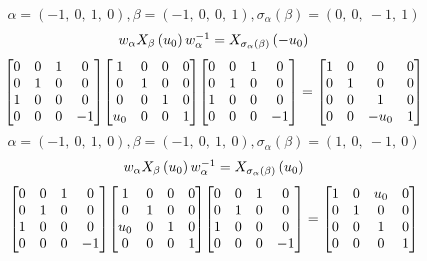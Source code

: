 \documentclass[11pt]{article}
\theoremstyle{definition}
\begin{document}
\[
\alpha = \left( -1, \  0, \  1, \  0\right), \beta = \left( -1, \  0, \  0, \  1\right), \sigma_{\alpha}(\beta) = \left( 0, \  0, \  -1, \  1\right)
\]
\[
\scaletoalign{\textwidth}{w_{\alpha} X_{\beta}\left(u_{0}\right) w_{\alpha}^{-1} = X_{\sigma_{\alpha}\left(\beta\right)}\left(- u_{0}\right)}
\]
\[
\scaletoalign{\textwidth}{{\left[\begin{matrix}0 & 0 & 1 & 0\\0 & 1 & 0 & 0\\1 & 0 & 0 & 0\\0 & 0 & 0 & -1\end{matrix}\right]} {\left[\begin{matrix}1 & 0 & 0 & 0\\0 & 1 & 0 & 0\\0 & 0 & 1 & 0\\u_{0} & 0 & 0 & 1\end{matrix}\right]} {\left[\begin{matrix}0 & 0 & 1 & 0\\0 & 1 & 0 & 0\\1 & 0 & 0 & 0\\0 & 0 & 0 & -1\end{matrix}\right]} = {\left[\begin{matrix}1 & 0 & 0 & 0\\0 & 1 & 0 & 0\\0 & 0 & 1 & 0\\0 & 0 & - u_{0} & 1\end{matrix}\right]}}
\]
\[
\alpha = \left( -1, \  0, \  1, \  0\right), \beta = \left( -1, \  0, \  1, \  0\right), \sigma_{\alpha}(\beta) = \left( 1, \  0, \  -1, \  0\right)
\]
\[
\scaletoalign{\textwidth}{w_{\alpha} X_{\beta}\left(u_{0}\right) w_{\alpha}^{-1} = X_{\sigma_{\alpha}\left(\beta\right)}\left(u_{0}\right)}
\]
\[
\scaletoalign{\textwidth}{{\left[\begin{matrix}0 & 0 & 1 & 0\\0 & 1 & 0 & 0\\1 & 0 & 0 & 0\\0 & 0 & 0 & -1\end{matrix}\right]} {\left[\begin{matrix}1 & 0 & 0 & 0\\0 & 1 & 0 & 0\\u_{0} & 0 & 1 & 0\\0 & 0 & 0 & 1\end{matrix}\right]} {\left[\begin{matrix}0 & 0 & 1 & 0\\0 & 1 & 0 & 0\\1 & 0 & 0 & 0\\0 & 0 & 0 & -1\end{matrix}\right]} = {\left[\begin{matrix}1 & 0 & u_{0} & 0\\0 & 1 & 0 & 0\\0 & 0 & 1 & 0\\0 & 0 & 0 & 1\end{matrix}\right]}}
\]
\end{document}
